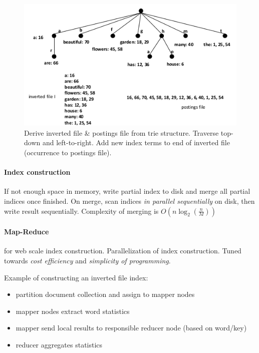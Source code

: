 \begin{figure}
  \centering
  \includegraphics[width=\linewidth]{figures/trie_to_postings.png}
  \caption{Derive inverted file \& postings file from trie structure. Traverse top-down and left-to-right. Add new index terms to end of inverted file (occurrence to postings file).}
  \label{fig:trie_to_postings}
\end{figure}

\paragraph{Index construction} If not enough space in memory, write partial index to disk and merge all partial indices once finished. On merge, scan indices \emph{in parallel sequentially} on disk, then write result sequentially. Complexity of merging is $O(n\log_2(\frac{n}{M}))$

\paragraph{Map-Reduce} for web scale index construction. Parallelization of index construction. Tuned towards \emph{cost efficiency} and \emph{simplicity of programming}.

Example of constructing an inverted file index:
\begin{itemize}
  \item partition document collection and assign to mapper nodes
  \item mapper nodes extract word statistics
  \item mapper send local results to responsible reducer node (based on word/key)
  \item reducer aggregates statistics
\end{itemize}

